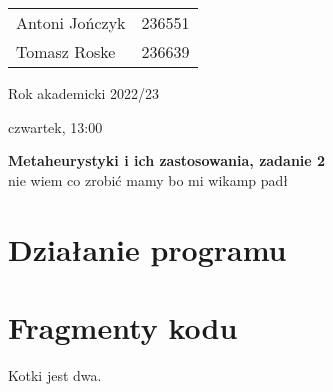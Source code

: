 \documentclass{article}
\begin{document}
\begin{minipage}{0.35\linewidth}
	\begin{tabular}{lr}
		Antoni Jończyk & 236551 \\
		Tomasz Roske   & 236639
	\end{tabular} \hfill
\end{minipage}
\hfill
\begin{minipage}{0.35\linewidth}
	\hfill Rok akademicki 2022/23 \par
	\hfill czwartek, 13:00
\end{minipage}
\bigskip \bigskip \bigskip \bigskip \bigskip
\begin{center}
	\textbf{Metaheurystyki i ich zastosowania, zadanie 2}\\
	\bigskip
	\large nie wiem co zrobić mamy bo mi wikamp padł
\end{center}
\bigskip \bigskip
\section{Działanie programu}
\section{Fragmenty kodu}
Kotki jest dwa.
\inputminted{clojure}{snippets/alg.clj_advance}
\end{document}
